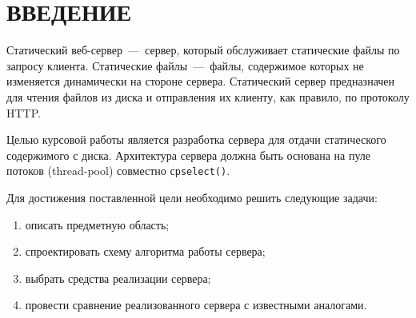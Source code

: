 \chapter*{ВВЕДЕНИЕ}

Статический веб-сервер~---~сервер, который обслуживает статические файлы по запросу клиента.
Статические файлы~---~файлы, содержимое которых не изменяется динамически на стороне сервера.
Статический сервер предназначен для чтения файлов из диска и отправления их клиенту, как правило, по протоколу HTTP.

Целью курсовой работы является разработка сервера для отдачи статического содержимого с диска.
Архитектура сервера должна быть основана на пуле потоков (thread-pool) совместно с\texttt{pselect()}.

Для достижения поставленной цели необходимо решить следующие задачи:
\begin{enumerate}
	\item описать предметную область;
	\item спроектировать схему алгоритма работы сервера;
	\item выбрать средства реализации сервера;
	\item провести сравнение реализованного сервера с известными аналогами.
\end{enumerate} 
